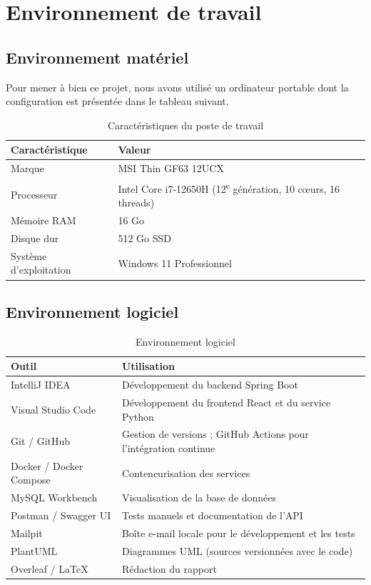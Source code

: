 \documentclass[12pt,a4paper]{report}
\newcommand{\thead}[1]{\textbf{#1}}
\begin{document}
\section{Environnement de travail}

\subsection{Environnement matériel}
Pour mener à bien ce projet, nous avons utilisé un ordinateur portable dont la configuration est présentée dans le tableau suivant.
\begin{table}[H]
\centering
\begin{tabularx}{0.85\textwidth}{|p{4.5cm}|L|}
\hline
{}\thead{Caractéristique} & \thead{Valeur} \\ \hline
Marque & MSI Thin GF63 12UCX \\ \hline
Processeur & Intel Core i7-12650H (12\textsuperscript{e} génération, 10 cœurs, 16 threads) \\ \hline
Mémoire RAM & 16 Go \\ \hline
Disque dur & 512 Go SSD \\ \hline
Système d'exploitation & Windows 11 Professionnel \\ \hline
\end{tabularx}
\caption{Caractéristiques du poste de travail}
\end{table}

\subsection{Environnement logiciel}
\begin{table}[H]
\centering
\begin{tabularx}{\textwidth}{|p{4cm}|L|}
\hline
{}\thead{Outil} & \thead{Utilisation} \\ \hline
IntelliJ IDEA & Développement du backend Spring Boot \cite{intellij} \\ \hline
Visual Studio Code & Développement du frontend React et du service Python \cite{vscode} \\ \hline
Git / GitHub & Gestion de versions ; GitHub Actions pour l'intégration continue \cite{github} \\ \hline
Docker / Docker Compose & Conteneurisation des services \cite{docker} \\ \hline
MySQL Workbench & Visualisation de la base de données \\ \hline
Postman / Swagger UI & Tests manuels et documentation de l'API \cite{springdoc} \\ \hline
Mailpit & Boîte e-mail locale pour le développement et les tests \cite{mailpit} \\ \hline
PlantUML & Diagrammes UML (sources versionnées avec le code) \cite{plantuml} \\ \hline
Overleaf / LaTeX & Rédaction du rapport \\ \hline
\end{tabularx}
\caption{Environnement logiciel}
\end{table}
\end{document}

